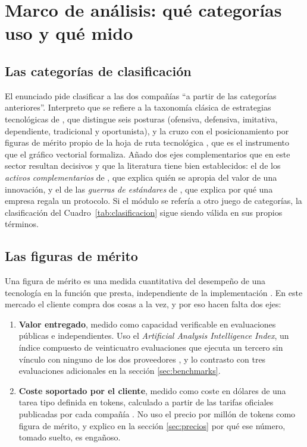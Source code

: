 \documentclass[11pt,letterpaper]{article}
\begin{document}
\section{Marco de análisis: qué categorías uso y qué mido}

\subsection*{Las categorías de clasificación}

El enunciado pide clasificar a las dos compañías \enquote{a partir de las
categorías anteriores}. Interpreto que se refiere a la taxonomía clásica de
estrategias tecnológicas de \textcite{freeman1997}, que distingue seis posturas
(ofensiva, defensiva, imitativa, dependiente, tradicional y oportunista), y la
cruzo con el posicionamiento por figuras de mérito propio de la hoja de ruta
tecnológica \parencite{deweck2022}, que es el instrumento que el gráfico
vectorial formaliza. Añado dos ejes complementarios que en este sector resultan
decisivos y que la literatura tiene bien establecidos: el de los \emph{activos
complementarios} de \textcite{teece1986}, que explica quién se apropia del valor
de una innovación, y el de las \emph{guerras de estándares} de
\textcite{shapiro1999}, que explica por qué una empresa regala un protocolo.
Si el módulo se refería a otro juego de categorías, la clasificación del
Cuadro~\ref{tab:clasificacion} sigue siendo válida en sus propios términos.

\subsection*{Las figuras de mérito}

Una figura de mérito es una medida cuantitativa del desempeño de una tecnología
en la función que presta, independiente de la implementación
\parencite{deweck2022}. En este mercado el cliente compra dos cosas a la vez, y
por eso hacen falta dos ejes:

\begin{enumerate}
  \item \textbf{Valor entregado}, medido como capacidad verificable en
    evaluaciones públicas e independientes. Uso el \emph{Artificial Analysis
    Intelligence Index}, un índice compuesto de veinticuatro evaluaciones que
    ejecuta un tercero sin vínculo con ninguno de los dos proveedores
    \parencite{aa2026modelos}, y lo contrasto con tres evaluaciones adicionales
    en la sección \ref{sec:benchmarks}.
  \item \textbf{Coste soportado por el cliente}, medido como coste en dólares de
    una tarea tipo definida en tokens, calculado a partir de las tarifas
    oficiales publicadas por cada compañía
    \parencite{anthropic2026precios,openai2026precios}. No uso el precio por
    millón de tokens como figura de mérito, y explico en la sección \ref{sec:precios} por qué
    ese número, tomado suelto, es engañoso.
\end{enumerate}
\end{document}
